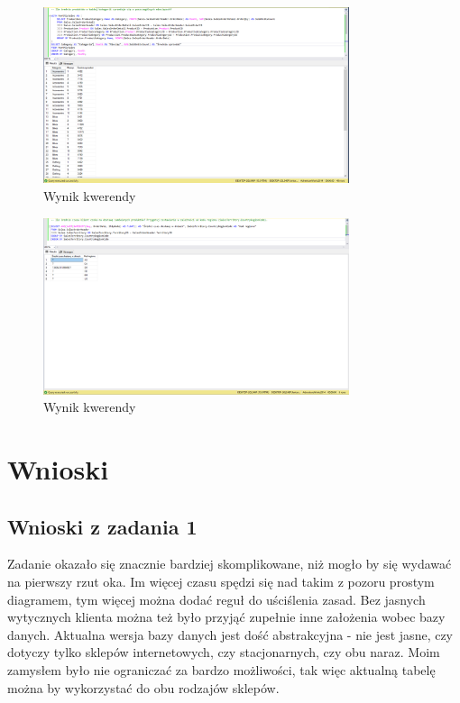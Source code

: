 \documentclass[a4paper,12pt]{article}
\begin{document}
\begin{figure}[H]
    \centering
    \includegraphics[width=0.8\textwidth]{images/09.png}
    \caption{Wynik kwerendy}
    \end{figure}

\begin{figure}[H]
    \centering
    \includegraphics[width=0.8\textwidth]{images/10.png}
    \caption{Wynik kwerendy}
    \end{figure}

\section{Wnioski}

\subsection{Wnioski z zadania 1}

Zadanie okazało się znacznie bardziej skomplikowane, niż mogło by się wydawać na pierwszy rzut oka. Im więcej czasu spędzi się nad takim z pozoru prostym diagramem, tym więcej można dodać reguł do uściślenia zasad. Bez jasnych wytycznych klienta można też było przyjąć zupełnie inne założenia wobec bazy danych. Aktualna wersja bazy danych jest dość abstrakcyjna - nie jest jasne, czy dotyczy tylko sklepów internetowych, czy stacjonarnych, czy obu naraz. Moim zamysłem było nie ograniczać za bardzo możliwości, tak więc aktualną tabelę można by wykorzystać do obu rodzajów sklepów.
\end{document}
